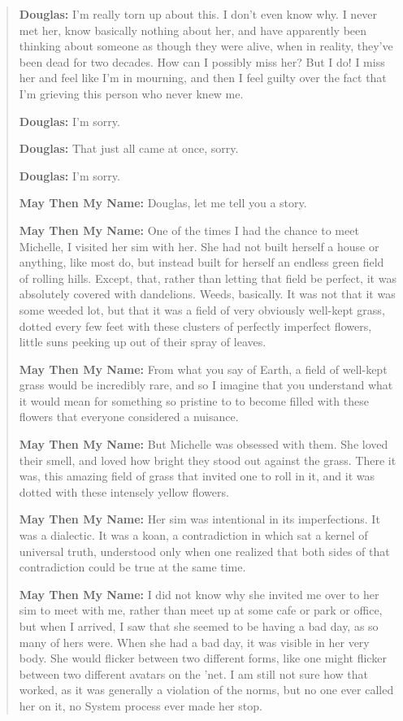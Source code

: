 \begin{quote}
\textbf{Douglas:} I'm really torn up about this. I don't even know why. I never met her, know basically nothing about her, and have apparently been thinking about someone as though they were alive, when in reality, they've been dead for two decades. How can I possibly miss her? But I do! I miss her and feel like I'm in mourning, and then I feel guilty over the fact that I'm grieving this person who never knew me.

\textbf{Douglas:} I'm sorry.

\textbf{Douglas:} That just all came at once, sorry.

\textbf{Douglas:} I'm sorry.

\textbf{May Then My Name:} Douglas, let me tell you a story.

\textbf{May Then My Name:} One of the times I had the chance to meet Michelle, I visited her sim with her. She had not built herself a house or anything, like most do, but instead built for herself an endless green field of rolling hills. Except, that, rather than letting that field be perfect, it was absolutely covered with dandelions. Weeds, basically. It was not that it was some weeded lot, but that it was a field of very obviously well-kept grass, dotted every few feet with these clusters of perfectly imperfect flowers, little suns peeking up out of their spray of leaves.

\textbf{May Then My Name:} From what you say of Earth, a field of well-kept grass would be incredibly rare, and so I imagine that you understand what it would mean for something so pristine to to become filled with these flowers that everyone considered a nuisance.

\textbf{May Then My Name:} But Michelle was obsessed with them. She loved their smell, and loved how bright they stood out against the grass. There it was, this amazing field of grass that invited one to roll in it, and it was dotted with these intensely yellow flowers.

\textbf{May Then My Name:} Her sim was intentional in its imperfections. It was a dialectic. It was a koan, a contradiction in which sat a kernel of universal truth, understood only when one realized that both sides of that contradiction could be true at the same time.

\textbf{May Then My Name:} I did not know why she invited me over to her sim to meet with me, rather than meet up at some cafe or park or office, but when I arrived, I saw that she seemed to be having a bad day, as so many of hers were. When she had a bad day, it was visible in her very body. She would flicker between two different forms, like one might flicker between two different avatars on the 'net. I am still not sure how that worked, as it was generally a violation of the norms, but no one ever called her on it, no System process ever made her stop.


\end{quote}
